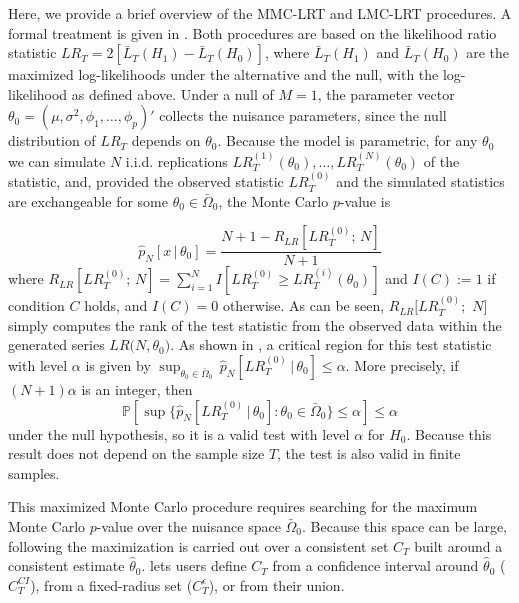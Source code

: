 Here, we provide a brief overview of the MMC-LRT and LMC-LRT procedures. A formal treatment is given in \citet{rodrondufour_mcmstest}. Both procedures are based on the likelihood ratio statistic \(LR_{T}=2[\bar{L}_{T}(H_{1})-\bar{L}_{T}(H_{0})]\), where \(\bar{L}_{T}(H_{1})\) and \(\bar{L}_{T}(H_{0})\) are the maximized log-likelihoods under the alternative and the null, with the log-likelihood as defined above. Under a null of \(M=1\), the parameter vector \(\theta_{0}=(\mu,\sigma^{2},\phi_{1},\ldots,\phi_{p})'\) collects the nuisance parameters, since the null distribution of \(LR_{T}\) depends on \(\theta_{0}\). Because the model is parametric, for any \(\theta_{0}\) we can simulate \(N\) i.i.d. replications \(LR_{T}^{(1)}(\theta_{0}),\ldots,LR_{T}^{(N)}(\theta_{0})\) of the statistic, and, provided the observed statistic \(LR_{T}^{(0)}\) and the simulated statistics are exchangeable for some \(\theta_{0}\in\bar{\Omega}_{0}\), the Monte Carlo \(p\)-value is

\begin{equation}
    \hat{p}_{N}[x\,|\,\theta_{0}]=\frac{N+1-R_{LR}[LR_{T}^{(0)};\,N]}{N+1} \label{eq:mmc-pval}
\end{equation}
where
\(R_{LR}[LR_{T}^{(0)};\,N] =\sum_{i=1}^{N}I[LR_{T}^{(0)}\geq LR_{T}^{(i)}(\theta _{0})]\)
and \(I(C):=1\) if condition \(C\) holds, and \(I(C)=0\) otherwise. As can be seen, \(R_{LR}[LR_{T}^{(0)};\) \thinspace \(N]\) simply computes the rank of the test statistic from the observed data within the generated series \(LR(N,\)\thinspace \(\theta_{0})\). As shown in \citet{rodrondufour_mcmstest}, a critical region for this test statistic with level \(\alpha\) is given by \(\sup_{\theta_{0}\in \bar{\Omega}_{0}}\,\hat{p}_{N}[LR_{T}^{(0)}\,|\,\theta_{0}]\leq \alpha\). More precisely, if \((N+1)\alpha\) is an integer, then
\begin{equation*}
    \mathbb{P}\left[ \sup \{\hat{p}_{N}[LR_{T}^{(0)}\,|\,\theta_{0}]:\theta_{0}\in \bar{\Omega}_{0}\}\leq \alpha \right] \leq \alpha 
\end{equation*}
under the null hypothesis, so it is a valid test with level \(\alpha\) for \(H_{0}\). Because this result does not depend on the sample size \(T\), the test is also valid in finite samples.

This maximized Monte Carlo procedure requires searching for the maximum Monte Carlo \(p\)-value over the nuisance space \(\bar{\Omega}_{0}\). Because this space can be large, following \citet{dufour2006} the maximization is carried out over a consistent set \(C_T\) built around a consistent estimate \(\hat{\theta}_{0}\).  lets users define \(C_T\) from a confidence interval around \(\hat{\theta}_{0}\) (\(C_T^{CI}\)), from a fixed-radius set (\(C_T^{\epsilon}\)), or from their union.

